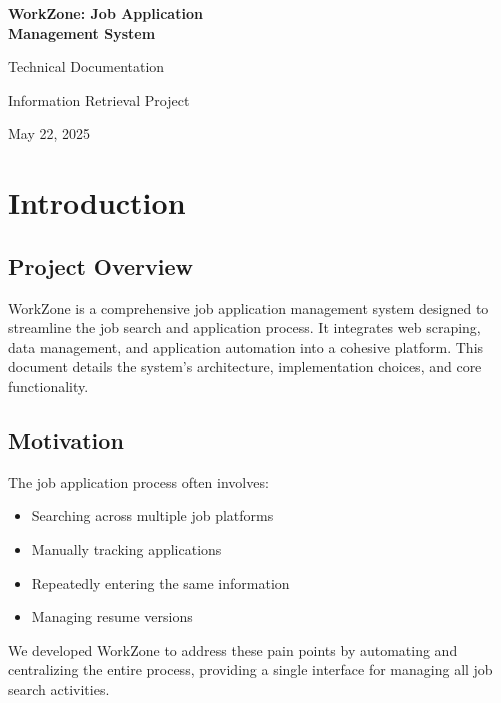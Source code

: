 \documentclass[12pt,a4paper]{article}
\begin{document}
\begin{titlepage}
\begin{center}
\vspace*{2cm}

{\huge\bfseries WorkZone: Job Application\\[0.5cm]Management System\\[2cm]}

{\Large Technical Documentation\\[2cm]}

{\large Information Retrieval Project\\[1cm]}

{\large May 22, 2025}

\vfill
\end{center}
\end{titlepage}

\newpage
\tableofcontents
\newpage

\section{Introduction}

\subsection{Project Overview}
WorkZone is a comprehensive job application management system designed to streamline the job search and application process. It integrates web scraping, data management, and application automation into a cohesive platform. This document details the system's architecture, implementation choices, and core functionality.

\subsection{Motivation}
The job application process often involves:
\begin{itemize}
    \item Searching across multiple job platforms
    \item Manually tracking applications
    \item Repeatedly entering the same information
    \item Managing resume versions
\end{itemize}

We developed WorkZone to address these pain points by automating and centralizing the entire process, providing a single interface for managing all job search activities.
\end{document}
